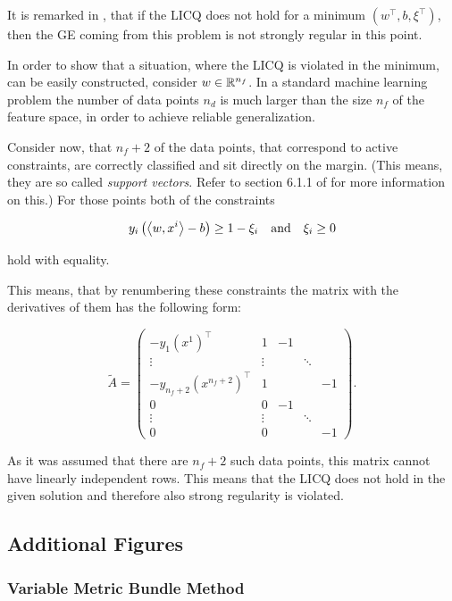 It is remarked in \cite[p. 96]{Outrata1998}, that if the LICQ does not hold for a minimum \((w^{\top},b,\xi^{\top})\), then the GE coming from this problem is not strongly regular in this point.

In order to show that a situation, where the LICQ is violated in the minimum, can be easily constructed, consider \(w \in \mathbb{R}^{n_f}\). In a standard machine learning problem the number of data points \(n_d\) is much larger than the size \(n_f\) of the feature space, in order to achieve reliable generalization.

Consider now, that \(n_f+2\) of the data points, that correspond to active constraints, are correctly classified and sit directly on the margin. (This means, they are so called \emph{support vectors}. Refer to section 6.1.1 of \cite{Cristianini2000} for more information on this.)
For those points both of the constraints 

\[ y_i\left(\left\langle w,x^i\right\rangle-b\right) \geq 1-\xi_i \quad \text{and} \quad \xi_i \geq 0 \]

hold with equality.

This means, that by renumbering these constraints the matrix with the derivatives of them has the following form:

\[  \tilde{A} = \begin{pmatrix} -y_1(x^1)^{\top} & 1 & -1 \\
                     \vdots & \vdots & & \ddots \\
										-y_{n_f+2}(x^{n_f+2})^{\top} & 1 & & & -1\\										0 & 0 & -1 \\
										\vdots & \vdots & & \ddots \\
										0 & 0 & & & -1\end{pmatrix}.\]
										
As it was assumed that there are \(n_f+2\) such data points, this matrix cannot have linearly independent rows. This means that the LICQ does not hold in the given solution and therefore also strong regularity is violated.

\subsection{Additional Figures}

\subsubsection{Variable Metric Bundle Method}

